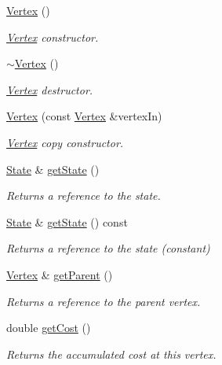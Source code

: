 \begin{DoxyCompactItemize}
\item 
\hyperlink{class_r_r_tstar_1_1_vertex_a9279fe771abe476de9728bbbcf96f10e}{Vertex} ()
\begin{DoxyCompactList}\small\item\em \hyperlink{class_r_r_tstar_1_1_vertex}{Vertex} constructor. \end{DoxyCompactList}\item 
\hyperlink{class_r_r_tstar_1_1_vertex_aedb6cbbe989f2c4e6b42dede84ea3cb5}{$\sim$\-Vertex} ()
\begin{DoxyCompactList}\small\item\em \hyperlink{class_r_r_tstar_1_1_vertex}{Vertex} destructor. \end{DoxyCompactList}\item 
\hyperlink{class_r_r_tstar_1_1_vertex_aa84a348a6d31e10631809410865fca9d}{Vertex} (const \hyperlink{class_r_r_tstar_1_1_vertex}{Vertex} \&vertex\-In)
\begin{DoxyCompactList}\small\item\em \hyperlink{class_r_r_tstar_1_1_vertex}{Vertex} copy constructor. \end{DoxyCompactList}\item 
\hyperlink{class_state}{State} \& \hyperlink{class_r_r_tstar_1_1_vertex_a2de3cd7ce358c501fcb9aac7eac71c32}{get\-State} ()
\begin{DoxyCompactList}\small\item\em Returns a reference to the state. \end{DoxyCompactList}\item 
\hyperlink{class_state}{State} \& \hyperlink{class_r_r_tstar_1_1_vertex_aaba29c8d7e356ad040e5e5bad82a6aae}{get\-State} () const 
\begin{DoxyCompactList}\small\item\em Returns a reference to the state (constant) \end{DoxyCompactList}\item 
\hyperlink{class_r_r_tstar_1_1_vertex}{Vertex} \& \hyperlink{class_r_r_tstar_1_1_vertex_a8a873c199e7824909152bfab01824da5}{get\-Parent} ()
\begin{DoxyCompactList}\small\item\em Returns a reference to the parent vertex. \end{DoxyCompactList}\item 
double \hyperlink{class_r_r_tstar_1_1_vertex_ab73dc02461b311f791764d75536e421b}{get\-Cost} ()
\begin{DoxyCompactList}\small\item\em Returns the accumulated cost at this vertex. \end{DoxyCompactList}\end{DoxyCompactItemize}
